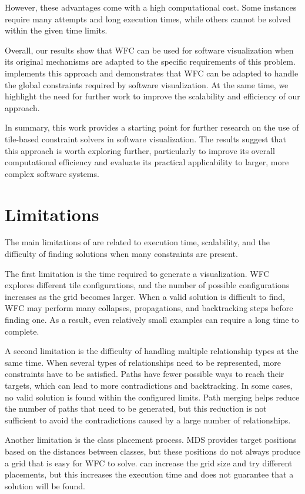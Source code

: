 \documentclass[../main.tex]{subfiles}
\begin{document}
However, these advantages come with a high computational cost. Some instances require many attempts and long execution times, while others cannot be solved within the given time limits.

Overall, our results show that WFC can be used for software visualization when its original mechanisms are adapted to the specific requirements of this problem. \wassis implements this approach and demonstrates that WFC can be adapted to handle the global constraints required by software visualization. At the same time, we highlight the need for further work to improve the scalability and efficiency of our approach.

In summary, this work provides a starting point for further research on the use of tile-based constraint solvers in software visualization. The results suggest that this approach is worth exploring further, particularly to improve its overall computational efficiency and evaluate its practical applicability to larger, more complex software systems.

\clearpage

\section{Limitations}

The main limitations of \wassis are related to execution time, scalability, and the difficulty of finding solutions when many constraints are present.

The first limitation is the time required to generate a visualization. WFC explores different tile configurations, and the number of possible configurations increases as the grid becomes larger. When a valid solution is difficult to find, WFC may perform many collapses, propagations, and backtracking steps before finding one. As a result, even relatively small examples can require a long time to complete.

A second limitation is the difficulty of handling multiple relationship types at the same time. When several types of relationships need to be represented, more constraints have to be satisfied. Paths have fewer possible ways to reach their targets, which can lead to more contradictions and backtracking. In some cases, no valid solution is found within the configured limits. Path merging helps reduce the number of paths that need to be generated, but this reduction is not sufficient to avoid the contradictions caused by a large number of relationships.

Another limitation is the class placement process. MDS provides target positions based on the distances between classes, but these positions do not always produce a grid that is easy for WFC to solve. \wassis can increase the grid size and try different placements, but this increases the execution time and does not guarantee that a solution will be found.
\end{document}
